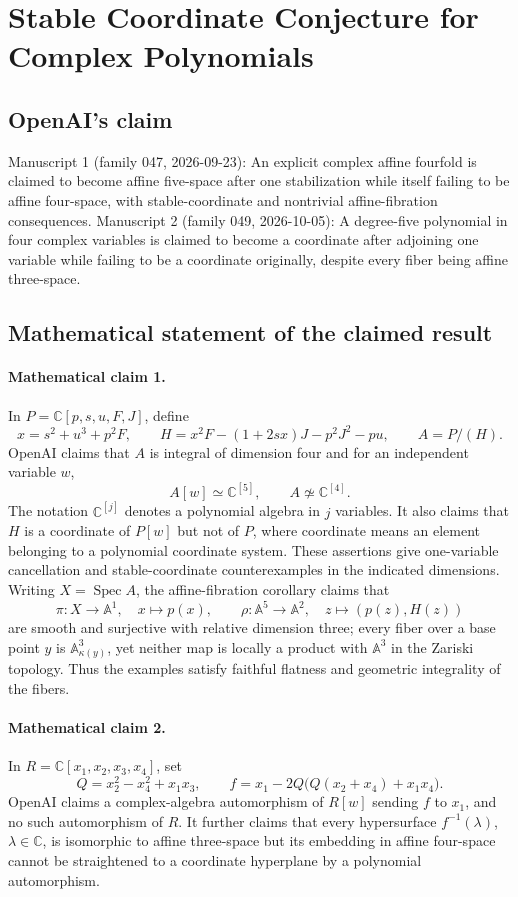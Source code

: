 \documentclass[11pt]{article}
\begin{document}
\section*{Stable Coordinate Conjecture for Complex Polynomials}

\subsection{OpenAI's claim}
Manuscript 1 (family 047, 2026-09-23): An explicit complex affine fourfold is claimed to become affine five-space after one stabilization while itself failing to be affine four-space, with stable-coordinate and nontrivial affine-fibration consequences. Manuscript 2 (family 049, 2026-10-05): A degree-five polynomial in four complex variables is claimed to become a coordinate after adjoining one variable while failing to be a coordinate originally, despite every fiber being affine three-space.

\subsection{Mathematical statement of the claimed result}
\paragraph{Mathematical claim 1.} In $P=\mathbb C[p,s,u,F,J]$, define
\[
x=s^2+u^3+p^2F,\qquad H=x^2F-(1+2sx)J-p^2J^2-pu,\qquad A=P/(H).
\]
OpenAI claims that $A$ is integral of dimension four and for an independent variable $w$,
\[
A[w]\simeq\mathbb C^{[5]},\qquad A\not\simeq\mathbb C^{[4]}.
\]
The notation $\mathbb C^{[j]}$ denotes a polynomial algebra in $j$ variables. It also claims that $H$ is a coordinate of $P[w]$ but not of $P$, where coordinate means an element belonging to a polynomial coordinate system. These assertions give one-variable cancellation and stable-coordinate counterexamples in the indicated dimensions.
Writing $X=\operatorname{Spec}A$, the affine-fibration corollary claims that
\[
\pi:X\to\mathbb A^1,\quad x\mapsto p(x),\qquad
\rho:\mathbb A^5\to\mathbb A^2,\quad z\mapsto(p(z),H(z))
\]
are smooth and surjective with relative dimension three; every fiber over a base point $y$ is $\mathbb A^3_{\kappa(y)}$, yet neither map is locally a product with $\mathbb A^3$ in the Zariski topology. Thus the examples satisfy faithful flatness and geometric integrality of the fibers.

\paragraph{Mathematical claim 2.} In $R=\mathbb C[x_1,x_2,x_3,x_4]$, set
\[
Q=x_2^2-x_4^2+x_1x_3,\qquad f=x_1-2Q\bigl(Q(x_2+x_4)+x_1x_4\bigr).
\]
OpenAI claims a complex-algebra automorphism of $R[w]$ sending $f$ to $x_1$, and no such automorphism of $R$. It further claims that every hypersurface $f^{-1}(\lambda)$, $\lambda\in\mathbb C$, is isomorphic to affine three-space but its embedding in affine four-space cannot be straightened to a coordinate hyperplane by a polynomial automorphism.
\end{document}
